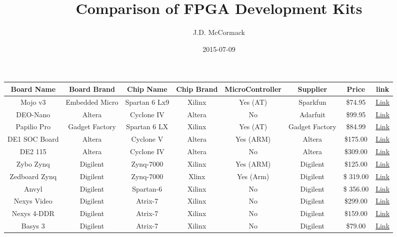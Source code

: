 \documentclass{article}
\title{Comparison of FPGA Development Kits}
\date{2015-07-09}
\author{J.D. McCormack}
\begin{document}
\begin{landscape}
\begin{center}

\begin{tabular}{||c c c c c c c c||}
	\hline
	Board Name  & Board Brand  & Chip Name & Chip Brand & MicroController  & Supplier & Price & link \\
	\hline\hline
	Mojo v3 & Embedded Micro  & Spartan 6 Lx9 & Xilinx & Yes (AT)&  Sparkfun & \$74.95 & 
	\href{https://www.sparkfun.com/products/11953}{Link}\\
	DEO-Nano & Altera & Cyclone IV & Altera & No &  Adarfuit & \$99.95 
	&\href{http://www.adafruit.com/products/451}{Link}\\
	Papilio Pro & Gadget Factory & Spartan 6 LX & Xilinx & Yes (AT) & Gadget Factory & \$84.99 & 
	\href{http://store.gadgetfactory.net/papilio-pro/}{Link}\\
	DE1 SOC Board & Altera & Cyclone V & Altera & Yes (ARM) & Altera & \$175.00 & 
	\href{http://wl.altera.com/education/univ/materials/boards/de1-soc/unv-de1-soc-board.html}{Link}\\
	DE2 115 & Altera & Cyclone IV & Altera &  No & Altera & \$309.00 & 
	\href{http://wl.altera.com/education/univ/materials/boards/de2-115/unv-de2-115-board.html}{Link}\\
	Zybo Zynq & Digilent & Zynq-7000 & Xilinx & Yes (ARM) & Digilent & \$125.00 & 
	\href{http://www.digilentinc.com/Products/Detail.cfm?NavPath=2,400,1198&Prod=ZYBO}{Link}\\
	Zedboard Zynq & Digilent & Zynq-7000 & Xlinx & Yes (Arm) & Digilent &  \$ 319.00 & 
	\href{http://www.digilentinc.com/Products/Detail.cfm?NavPath=2,400,1028&Prod=ZEDBOARD}{Link}\\
	Anvyl & Digilent & Spartan-6 & Xilinx & No & Digilent &  \$ 356.00 & 
	\href{http://www.digilentinc.com/Products/Detail.cfm?NavPath=2,400,1175&Prod=ANVYL}{Link}\\
	Nexys Video & Digilent & Atrix-7 & Xilinx & No & Digilent & \$299.00 &
	 \href{http://www.digilentinc.com/Products/Detail.cfm?NavPath=2,400,1475&Prod=NEXYS-VIDEO}{Link}\\
	Nexys 4-DDR & Digilent & Atrix-7 & Xilinx & No & Digilent & \$159.00 & 
	\href{http://www.digilentinc.com/Products/Detail.cfm?NavPath=2,400,1338&Prod=NEXYS4DDR}{Link}\\
	Basys 3 & Digilent & Atrix-7 & Xilinx & No & Digilent & \$79.00 & 
	\href{http://www.digilentinc.com/Products/Detail.cfm?NavPath=2,400,1288&Prod=BASYS3}{Link} \\
	\hline
\end{tabular}
\end{center}
\end{landscape}
	\newpage
\end{document}
